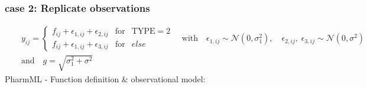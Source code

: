 \documentclass[a4paper,10pt]{article}
\begin{document}
\subsubsection{case 2: Replicate observations}
\begin{eqnarray}
&& y_{ij} = \left\{ \begin{array}{rcl}  f_{ij} + \epsilon_{1,ij} + \epsilon_{2,ij} & \mbox{for}  & \mbox{TYPE}  = 2 \\
f_{ij} + \epsilon_{1,ij}  + \epsilon_{3,ij}    & \mbox{for} & else  
\end{array}\right. \quad \mbox{with} \quad \epsilon_{1,ij} \sim \mathcal{N}(0,\sigma_1^2), \quad \epsilon_{2,ij},\;\epsilon_{3,ij} \sim \mathcal{N}(0,\sigma^2) \nonumber \\
&& \mbox{and} \quad g = \sqrt{\sigma_1^2 + \sigma^2} \nonumber
\end{eqnarray}
PharmML - Function definition \& observational model:
\end{document}
